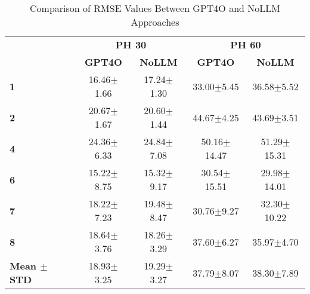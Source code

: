 \begin{table}
\caption{Comparison of RMSE Values Between GPT4O and NoLLM Approaches}
\label{tab:rmse_comparison}
\centering
\renewcommand{\arraystretch}{1.3}
\begin{tabular}{|l|cc|cc|}
\hline
\rowcolor{gray!20} \multirow{1}{*}{\textbf{Patient}} & \multicolumn{2}{c|}{\textbf{PH 30}} & \multicolumn{2}{c|}{\textbf{PH 60}} \\[+0.5ex]
\rowcolor{gray!20} & \textbf{GPT4O} & \textbf{NoLLM} & \textbf{GPT4O} & \textbf{NoLLM} \\[-1.5ex]
\hline
\rowcolor{gray!10}
\textbf{1} & 16.46$\pm$1.66 & 17.24$\pm$1.30 & 33.00$\pm$5.45 & 36.58$\pm$5.52 \\
\hline
\textbf{2} & 20.67$\pm$1.67 & 20.60$\pm$1.44 & 44.67$\pm$4.25 & 43.69$\pm$3.51 \\
\hline
\rowcolor{gray!10}
\textbf{4} & 24.36$\pm$6.33 & 24.84$\pm$7.08 & 50.16$\pm$14.47 & 51.29$\pm$15.31 \\
\hline
\textbf{6} & 15.22$\pm$8.75 & 15.32$\pm$9.17 & 30.54$\pm$15.51 & 29.98$\pm$14.01 \\
\hline
\rowcolor{gray!10}
\textbf{7} & 18.22$\pm$7.23 & 19.48$\pm$8.47 & 30.76$\pm$9.27 & 32.30$\pm$10.22 \\
\hline
\textbf{8} & 18.64$\pm$3.76 & 18.26$\pm$3.29 & 37.60$\pm$6.27 & 35.97$\pm$4.70 \\
\hline
\rowcolor{gray!20}
\textbf{Mean $\pm$ STD} & 18.93$\pm$3.25 & 19.29$\pm$3.27 & 37.79$\pm$8.07 & 38.30$\pm$7.89 \\
\hline
\end{tabular}
\end{table}